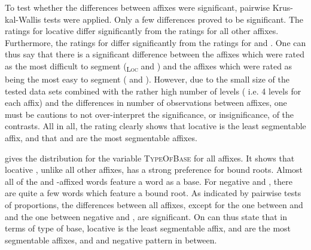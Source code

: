 To test whether the differences between affixes were significant, pairwise Krus-kal-Wallis tests were applied.  Only a few differences proved to be significant. The ratings for locative  differ significantly from the ratings for all other affixes. Furthermore, the ratings for  differ significantly from the ratings for  and . 
One can thus say that there is a significant difference between the affixes which were rated as the most difficult to segment (\textsubscript{\textsc{Loc}} and ) and the affixes which were rated as being the most easy to segment ( and ). However, due to the small size of the tested data sets combined with the rather high number of levels ( i.e. 4 levels for each affix) and the differences in number of observations between affixes, one must be cautions to not over-interpret the significance, or insignificance, of the contrasts. 
All in all, the rating clearly shows that locative  is the least segmentable affix, and that  and  are the most segmentable affixes.



 gives the distribution for the variable \textsc{TypeOfBase} for all affixes. It shows that locative , unlike all other affixes, has a strong preference for bound roots. Almost all of the  and -affixed words feature a word as a base. For negative  and , there are quite a few words which feature a bound root. As indicated by pairwise tests of proportions, the differences between all affixes, except for the one between  and  and the one between negative  and , are significant. On can thus state that in terms of type of base, locative  is the least segmentable affix,  and  are the most segmentable affixes, and  and negative  pattern in between.


